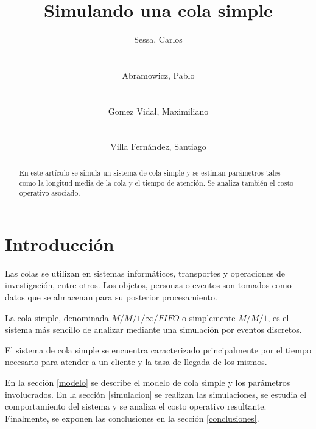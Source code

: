 \documentclass{sig-alternate}
\begin{document}
\title{Simulando una cola simple}


\author{
    \alignauthor
    Sessa, Carlos\\
     \\
    \ \\
    Abramowicz, Pablo\\
     \\
    \ \\
    \alignauthor
    Gomez Vidal, Maximiliano\\
     \\
    \ \\
    Villa Fern\'{a}ndez, Santiago\\
}

\maketitle

\begin{abstract}
En este art\'{i}culo se simula un sistema de cola simple y se estiman
par\'{a}metros tales como la longitud media de la cola y el tiempo de
atenci\'{o}n. Se analiza tambi\'{e}n el costo operativo asociado.
\end{abstract}


\section{Introducci\'{o}n}\label{introduccion}

Las colas se utilizan en sistemas inform\'{a}ticos, transportes y operaciones 
de investigaci\'{o}n, entre otros. Los objetos, personas o eventos son tomados 
como datos que se almacenan para su posterior procesamiento.


La cola simple, denominada $M/M/1/\infty/FIFO$ o simplemente $M/M/1$, es el 
sistema m\'{a}s sencillo de analizar mediante una simulaci\'{o}n por eventos 
discretos.


El sistema de cola simple se encuentra caracterizado principalmente por el 
tiempo necesario para atender a un cliente y la tasa de llegada de los mismos.


En la secci\'{o}n \ref{modelo} se describe el modelo de cola simple y los
par\'{a}metros involucrados. En la secci\'{o}n \ref{simulacion} se realizan
las simulaciones, se estudia el comportamiento del sistema y se analiza
el costo operativo resultante. Finalmente, se exponen las conclusiones en 
la secci\'{o}n \ref{conclusiones}.
\end{document}
